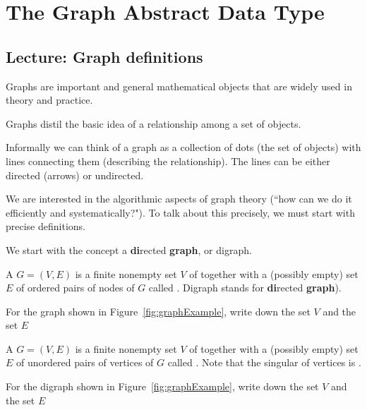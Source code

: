 \part{The Graph Abstract Data Type}
\label{ch:graphadt}


\chapter{Lecture: Graph definitions}
\label{sec:graphdefs}

Graphs are important and general mathematical objects that are widely used in theory and practice. 

Graphs distil the basic idea of a relationship among a set of objects. 

Informally we can think of a graph as a collection of dots (the set of objects) with lines connecting them (describing the relationship). The lines can be either directed (arrows) or undirected.

We are interested in the algorithmic aspects of graph theory (``how can we do it efficiently and
systematically?").  To talk about this precisely, we must
start with precise definitions.

We start with the concept a
\textbf{di}rected \textbf{graph}, or digraph. 


\begin{Definition}\label{def:digraph} 
A  $G=(V,E)$ is a  finite nonempty set $V$ of
 together with a (possibly empty) set $E$ of ordered pairs
of nodes of $G$ called . Digraph stands for
\textbf{di}rected \textbf{graph}).
\end{Definition}

\begin{mdframed}
\begin{Example}
For the graph shown  in Figure~\ref{fig:graphExample}, write down the set $V$ and the set $E$
\end{Example}
\vspace {3cm}
\end{mdframed}

\begin{Definition}\label{def:graph}
A  $G=(V,E)$ is a finite nonempty  set $V$ of 
 together with a (possibly empty) set $E$ of unordered
pairs of vertices of $G$ called . Note that the singular of vertices is .
\end{Definition}

\begin{mdframed}
\begin{Example}
For the digraph shown in Figure~\ref{fig:graphExample}, write down the set $V$ and the set $E$
\end{Example}
\vspace*{10cm}
\end{mdframed}


